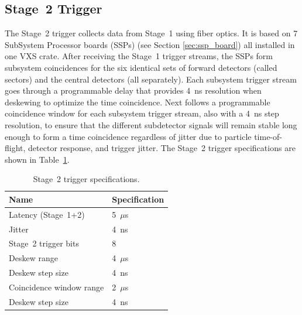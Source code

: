 \subsection{Stage~2 Trigger}

The Stage~2 trigger collects data from Stage~1 using fiber optics. It is based on 7 SubSystem Processor
boards (SSPs) (see Section \ref*{sec:ssp_board}) all installed in one VXS crate. After receiving the Stage~1
trigger streams, the SSPs form subsystem coincidences for the six identical sets of forward detectors (called
sectors) and the central detectors (all separately). Each subsystem trigger stream goes through a programmable
delay that provides 4~ns resolution when deskewing to optimize the time coincidence. Next follows a
programmable coincidence window for each subsystem trigger stream, also with a 4~ns step resolution, to ensure
that the different subdetector signals will remain stable long enough to form a time coincidence regardless of
jitter due to particle time-of-flight, detector response, and trigger jitter. The Stage~2 trigger specifications
are shown in Table~\ref{tab:stage_2_specs}.

\begin{table}
\begin{center}
	\begin{tabular}{| l | l |}
		\hline \hline
		Name				& Specification	\\
		\hline
		Latency (Stage~1+2)		& 5~$\mu$s	\\
		Jitter				& 4~ns		\\
		Stage~2 trigger bits		& 8		\\
		Deskew range			& 4~$\mu$s	\\
		Deskew step size		& 4~ns	\\
		Coincidence window range	& 2~$\mu$s	\\
		Deskew step size		& 4~ns	\\
		\hline \hline
	\end{tabular}
\end{center}
\caption{Stage~2 trigger specifications.}
\label{tab:stage_2_specs}
\end{table}

